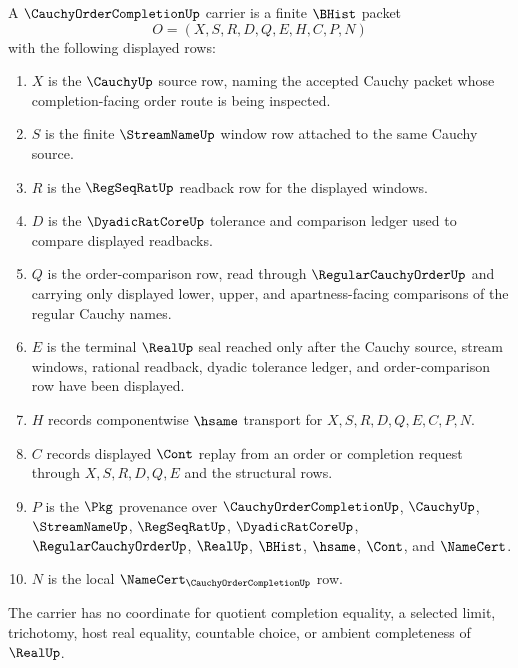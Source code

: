 \begin{definition}
\label{def:cauchy-order-completion-carrier}
A $\CauchyOrderCompletionUp$ carrier is a finite $\BHist$ packet
$$
O=(X,S,R,D,Q,E,H,C,P,N)
$$
with the following displayed rows:
\begin{enumerate}
\item $X$ is the $\CauchyUp$ source row, naming the accepted Cauchy packet whose completion-facing order route is being inspected.
\item $S$ is the finite $\StreamNameUp$ window row attached to the same Cauchy source.
\item $R$ is the $\RegSeqRatUp$ readback row for the displayed windows.
\item $D$ is the $\DyadicRatCoreUp$ tolerance and comparison ledger used to compare displayed readbacks.
\item $Q$ is the order-comparison row, read through $\RegularCauchyOrderUp$ and carrying only displayed lower, upper, and apartness-facing comparisons of the regular Cauchy names.
\item $E$ is the terminal $\RealUp$ seal reached only after the Cauchy source, stream windows, rational readback, dyadic tolerance ledger, and order-comparison row have been displayed.
\item $H$ records componentwise $\hsame$ transport for $X,S,R,D,Q,E,C,P,N$.
\item $C$ records displayed $\Cont$ replay from an order or completion request through $X,S,R,D,Q,E$ and the structural rows.
\item $P$ is the $\Pkg$ provenance over $\CauchyOrderCompletionUp$, $\CauchyUp$, $\StreamNameUp$, $\RegSeqRatUp$, $\DyadicRatCoreUp$, $\RegularCauchyOrderUp$, $\RealUp$, $\BHist$, $\hsame$, $\Cont$, and $\NameCert$.
\item $N$ is the local $\NameCert_{\CauchyOrderCompletionUp}$ row.
\end{enumerate}
The carrier has no coordinate for quotient completion equality, a selected limit, trichotomy, host real equality, countable choice, or ambient completeness of $\RealUp$.
\end{definition}

